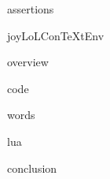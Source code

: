 
\usemodule[t-diSimp]

\startDiSimpComponent assertions

\diSimpEnvironment joyLoLConTeXtEnv

\startJoyLoLCoAlg[title=Assertions][assertions]

\diSimpComponent overview

\diSimpComponent code

\diSimpComponent words

\diSimpComponent lua

\diSimpComponent conclusion

\stopJoyLoLCoAlg

\stopDiSimpComponent
